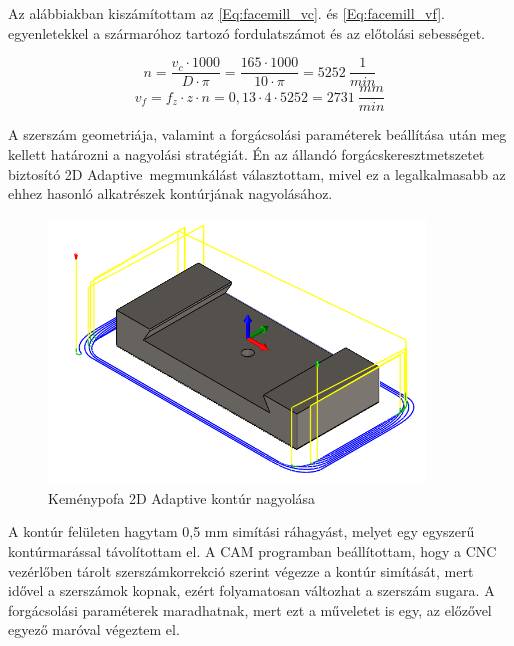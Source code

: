 \documentclass[12pt,a4paper,oneside]{report}
\begin{document}
Az alábbiakban kiszámítottam az \ref{Eq:facemill_vc}. és \ref{Eq:facemill_vf}. egyenletekkel a szármaróhoz tartozó fordulatszámot és az előtolási sebességet.

\begin{equation*}
    n=\dfrac{v_c\cdot1000}{D\cdot\pi}=\dfrac{165\cdot1000}{10\cdot\pi}=5252\ \dfrac{1}{min}
\end{equation*}
\begin{equation*}
    v_f=f_z\cdot z\cdot n=0,13\cdot4\cdot5252=2731\ \dfrac{mm}{min}
\end{equation*}

A szerszám geometriája, valamint a forgácsolási paraméterek beállítása után meg kellett határozni a nagyolási stratégiát. Én az állandó forgácskeresztmetszetet biztosító \glqq2D Adaptive\grqq\ megmunkálást választottam, mivel ez a legalkalmasabb az ehhez hasonló alkatrészek kontúrjának nagyolásához.

\begin{figure}[H]
    \centering
    \includegraphics[width=10cm]{figures/kemenypofa_adaptive_1.png}
    \caption{Keménypofa 2D Adaptive kontúr nagyolása}
    \label{Fig:kemenypofa_adaptive_1}
\end{figure}

A kontúr felületen hagytam 0,5 mm simítási ráhagyást, melyet egy egyszerű kontúrmarással távolítottam el. A CAM programban beállítottam, hogy a CNC vezérlőben tárolt szerszámkorrekció szerint végezze a kontúr simítását, mert idővel a szerszámok kopnak, ezért folyamatosan változhat a szerszám sugara. A forgácsolási paraméterek maradhatnak, mert ezt a műveletet is egy, az előzővel egyező maróval végeztem el.
\end{document}
